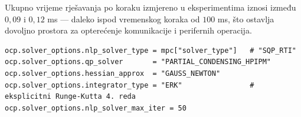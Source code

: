Ukupno vrijeme rješavanja po koraku izmjereno u eksperimentima iznosi između $0{,}09$ i $0{,}12$ ms --- daleko ispod vremenskog koraka od $100$ ms, što ostavlja dovoljno prostora za opterećenje komunikacije i perifernih operacija.

\begin{listing}[H]
\begin{verbatim}
ocp.solver_options.nlp_solver_type = mpc["solver_type"]   # "SQP_RTI"
ocp.solver_options.qp_solver       = "PARTIAL_CONDENSING_HPIPM"
ocp.solver_options.hessian_approx  = "GAUSS_NEWTON"
ocp.solver_options.integrator_type = "ERK"                # eksplicitni Runge-Kutta 4. reda
ocp.solver_options.nlp_solver_max_iter = 50
\end{verbatim}
\caption{Konfiguracija SQP\_RTI solvera u \texttt{src/mpc\_solver.py}}
\end{listing}
